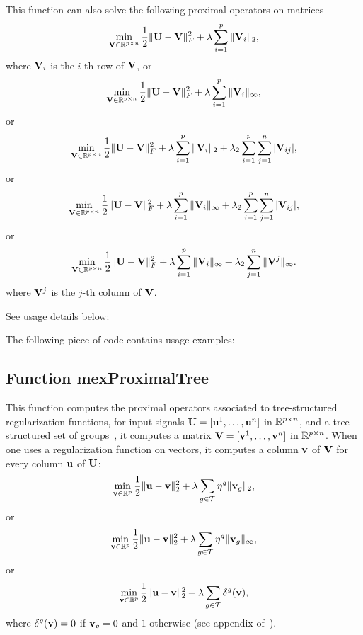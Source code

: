 \documentclass[a4paper, 11pt]{article}
\begin{document}
This function can also solve the following proximal operators on matrices
\begin{equation}
\min_{{\mathbf V} \in {\mathbb R}^{p \times n}} \frac{1}{2}\|{\mathbf U}-{\mathbf V}\|_F^2 + \lambda \sum_{i=1}^p \|{\mathbf V}_i\|_2, 
\end{equation}
where ${\mathbf V}_i$ is the $i$-th row of ${\mathbf V}$, or
\begin{equation}
\min_{{\mathbf V} \in {\mathbb R}^{p \times n}} \frac{1}{2}\|{\mathbf U}-{\mathbf V}\|_F^2 + \lambda \sum_{i=1}^p \|{\mathbf V}_i\|_\infty, 
\end{equation}
or
\begin{equation}
\min_{{\mathbf V} \in {\mathbb R}^{p \times n}} \frac{1}{2}\|{\mathbf U}-{\mathbf V}\|_F^2 + \lambda \sum_{i=1}^p \|{\mathbf V}_i\|_2 +\lambda_2 \sum_{i=1}^p\sum_{j=1}^n |{\mathbf V}_{ij}|, 
\end{equation}
or
\begin{equation}
\min_{{\mathbf V} \in {\mathbb R}^{p \times n}} \frac{1}{2}\|{\mathbf U}-{\mathbf V}\|_F^2 + \lambda \sum_{i=1}^p \|{\mathbf V}_i\|_\infty +\lambda_2 \sum_{i=1}^p\sum_{j=1}^n |{\mathbf V}_{ij}|, 
\end{equation}
or
\begin{equation}
\min_{{\mathbf V} \in {\mathbb R}^{p \times n}} \frac{1}{2}\|{\mathbf U}-{\mathbf V}\|_F^2 + \lambda \sum_{i=1}^p \|{\mathbf V}_i\|_\infty +\lambda_2 \sum_{j=1}^n \|{\mathbf V}^j\|_\infty.
\end{equation}
where ${\mathbf V}^j$ is the $j$-th column of ${\mathbf V}$.

   See usage details below:
%    

The following piece of code contains usage examples:


\subsection{Function mexProximalTree}
This function computes the proximal operators associated to tree-structured regularization functions, for input signals ${\mathbf U}=[{\mathbf u}^1,\ldots,{\mathbf u}^n]$ in ${\mathbb R}^{p \times n}$, and a tree-structured set of groups~\cite{jenatton3}, it computes a matrix ${\mathbf V}=[{\mathbf v}^1,\ldots,{\mathbf v}^n]$ in ${\mathbb R}^{p \times n}$. When one uses a regularization function on vectors, it computes a column ${\mathbf v}$ of ${\mathbf V}$ for every column ${\mathbf u}$ of ${\mathbf U}$:
\begin{equation}
\min_{{\mathbf v} \in {\mathbb R}^p} \frac{1}{2}\|{\mathbf u}-{\mathbf v}\|_2^2 + \lambda \sum_{g \in {\mathcal T}} \eta^g \|{\mathbf v}_g\|_2,
   \end{equation}
   or
   \begin{equation}
   \min_{{\mathbf v} \in {\mathbb R}^p} \frac{1}{2}\|{\mathbf u}-{\mathbf v}\|_2^2 + \lambda \sum_{g \in {\mathcal T}} \eta^g \|{\mathbf v}_g\|_\infty,
   \end{equation}
   or
   \begin{equation}
   \min_{{\mathbf v} \in {\mathbb R}^p} \frac{1}{2}\|{\mathbf u}-{\mathbf v}\|_2^2 + \lambda \sum_{g \in {\mathcal T}} \delta^g({\mathbf v}),
   \end{equation}
   where $\delta^g({\mathbf v})=0$ if ${\mathbf v}_g=0$ and $1$ otherwise (see appendix of~\cite{jenatton4}).
\end{document}
